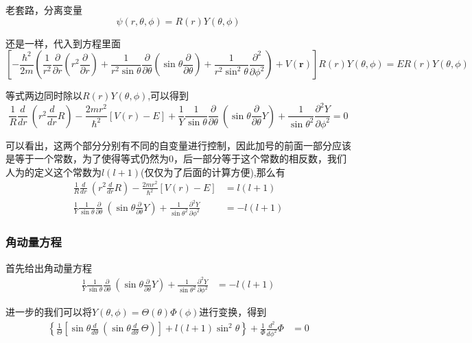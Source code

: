 \documentclass{article}
\newcommand{\Da}[2]{\frac{\partial}{\partial#2}#1}
\newcommand{\D}[2]{\frac{d}{d#2}#1}
\begin{document}
老套路，分离变量
\[
	\psi(r,\theta,\phi)=R(r)Y(\theta,\phi)
\]

还是一样，代入到方程里面
\[
	\left[-\frac{\hbar^2}{2m}\left(\frac{1}{r^2}\frac{\partial}{\partial r}\left(r^2\frac{\partial}{\partial r}\right)+\frac{1}{r^2\sin\theta}\frac{\partial}{\partial\theta}\left(\sin\theta\frac{\partial}{\partial\theta}\right)+\frac{1}{r^2\sin^2\theta}\frac{\partial^2}{\partial\phi^2}\right)+V(\textbf{r})\right]R(r)Y(\theta,\phi)=ER(r)Y(\theta,\phi)
\]

等式两边同时除以$R(r)Y(\theta,\phi)$,可以得到
\begin{equation*}
	\frac{1}{R}\D{~}{r}\left(r^2\D{R}{r}\right)-\frac{2mr^2}{\hbar^2}\left[V(r)-E\right]+\frac{1}{Y}\frac{1}{\sin{\theta}}\Da{~}{\theta}\left(\sin{\theta}\Da{Y}{\theta}\right)+\frac{1}{\sin{\theta}^2}\frac{\partial^2 Y}{\partial \phi^2}=0
\end{equation*}

可以看出，这两个部分分别有不同的自变量进行控制，因此加号的前面一部分应该是等于一个常数，为了使得等式仍然为$0$，后一部分等于这个常数的相反数，我们人为的定义这个常数为$l(l+1)$(仅仅为了后面的计算方便),那么有
\begin{align*}
	\frac{1}{R}\D{~}{r}\left(r^2\D{R}{r}\right)-\frac{2mr^2}{\hbar^2}\left[V(r)-E\right]                                                                & =l(l+1)  \\
	\frac{1}{Y}\frac{1}{\sin{\theta}}\Da{~}{\theta}\left(\sin{\theta}\Da{Y}{\theta}\right)+\frac{1}{\sin{\theta}^2}\frac{\partial^2 Y}{\partial \phi^2} & =-l(l+1)
\end{align*}




\subsubsection{角动量方程}
首先给出角动量方程
\begin{align*}
	\frac{1}{Y}\frac{1}{\sin{\theta}}\Da{~}{\theta}\left(\sin{\theta}\Da{Y}{\theta}\right)+\frac{1}{\sin{\theta}^2}\frac{\partial^2 Y}{\partial \phi^2} & =-l(l+1)
\end{align*}

进一步的我们可以将$Y(\theta,\phi)=\Theta(\theta)\Phi(\phi)$进行变换，得到
\begin{align*}
	\left\{\frac{1}{\Theta}\left[\sin{\theta}\D{~}{\theta}\left(\sin{\theta}\D{~}{\theta}\Theta\right)\right]+l(l+1)\sin^2{\theta}\right\}+\frac{1}{\Phi}\frac{d^2}{d\phi^2}\Phi & =0
\end{align*}
\end{document}
